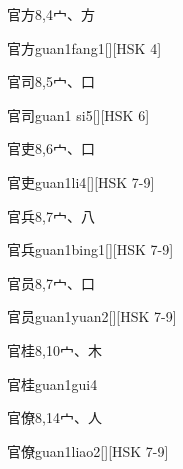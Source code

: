 \begin{Entry}{官方}{8,4}{⼧、⽅}
  \begin{Phonetics}{官方}{guan1fang1}[][HSK 4]
  \end{Phonetics}
\end{Entry}

\begin{Entry}{官司}{8,5}{⼧、⼝}
  \begin{Phonetics}{官司}{guan1 si5}[][HSK 6]
  \end{Phonetics}
\end{Entry}

\begin{Entry}{官吏}{8,6}{⼧、⼝}
  \begin{Phonetics}{官吏}{guan1li4}[][HSK 7-9]
  \end{Phonetics}
\end{Entry}

\begin{Entry}{官兵}{8,7}{⼧、⼋}
  \begin{Phonetics}{官兵}{guan1bing1}[][HSK 7-9]
  \end{Phonetics}
\end{Entry}

\begin{Entry}{官员}{8,7}{⼧、⼝}
  \begin{Phonetics}{官员}{guan1yuan2}[][HSK 7-9]
  \end{Phonetics}
\end{Entry}

\begin{Entry}{官桂}{8,10}{⼧、⽊}
  \begin{Phonetics}{官桂}{guan1gui4}
  \end{Phonetics}
\end{Entry}

\begin{Entry}{官僚}{8,14}{⼧、⼈}
  \begin{Phonetics}{官僚}{guan1liao2}[][HSK 7-9]
  \end{Phonetics}
\end{Entry}

